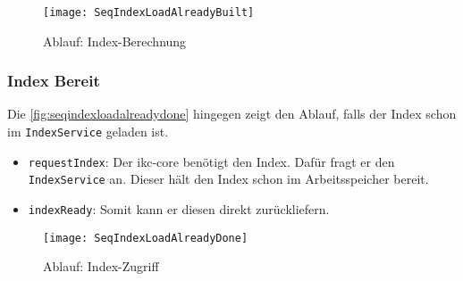     \begin{figure}[H]
    \centering
    \texttt{[image: SeqIndexLoadAlreadyBuilt]}
    \caption{Ablauf: Index-Berechnung}
    \label{fig:seqindexalreadybuilt}
    \end{figure}
    
    
    
\subsubsection{Index Bereit}
Die \autoref{fig:seqindexloadalreadydone} hingegen zeigt den Ablauf, falls der Index schon im \texttt{IndexService} geladen ist.

\begin{itemize}
    \item \texttt{requestIndex}: Der \gls{ikc-core} benötigt den Index. Dafür fragt er den \texttt{IndexService} an. Dieser hält den Index schon im Arbeitsspeicher bereit.
    \item \texttt{indexReady}: Somit kann er diesen direkt zurückliefern.
\end{itemize}
    
    \begin{figure}[H]
    \centering
    \texttt{[image: SeqIndexLoadAlreadyDone]}
    \caption{Ablauf: Index-Zugriff}
    \label{fig:seqindexloadalreadydone}
    \end{figure}
    
    
